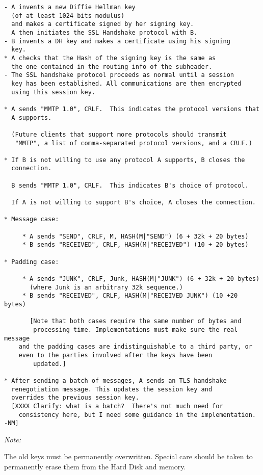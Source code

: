 \begin{verbatim}
- A invents a new Diffie Hellman key 
  (of at least 1024 bits modulus)
  and makes a certificate signed by her signing key.
  A then initiates the SSL Handshake protocol with B.
- B invents a DH key and makes a certificate using his signing
  key.
* A checks that the Hash of the signing key is the same as
  the one contained in the routing info of the subheader.
- The SSL handshake protocol proceeds as normal until a session
  key has been established. All communications are then encrypted
  using this session key.

* A sends "MMTP 1.0", CRLF.  This indicates the protocol versions that
  A supports.

  (Future clients that support more protocols should transmit
   "MMTP", a list of comma-separated protocol versions, and a CRLF.)

* If B is not willing to use any protocol A supports, B closes the 
  connection.

  B sends "MMTP 1.0", CRLF.  This indicates B's choice of protocol.

  If A is not willing to support B's choice, A closes the connection.

* Message case:

     * A sends "SEND", CRLF, M, HASH(M|"SEND") (6 + 32k + 20 bytes)
     * B sends "RECEIVED", CRLF, HASH(M|"RECEIVED") (10 + 20 bytes)

* Padding case:

     * A sends "JUNK", CRLF, Junk, HASH(M|"JUNK") (6 + 32k + 20 bytes)
       (where Junk is an arbitrary 32k sequence.)
     * B sends "RECEIVED", CRLF, HASH(M|"RECEIVED JUNK") (10 +20 bytes)

       [Note that both cases require the same number of bytes and 
        processing time. Implementations must make sure the real message 
	and the padding cases are indistinguishable to a third party, or 
	even to the parties involved after the keys have been
        updated.]

* After sending a batch of messages, A sends an TLS handshake
  renegotiation message. This updates the session key and
  overrides the previous session key.
  [XXXX Clarify: what is a batch?  There's not much need for
    consistency here, but I need some guidance in the implementation. -NM]

\end{verbatim}

\emph{Note:}

The old keys must be permanently overwritten. Special care should be
taken to permanently erase them from the Hard Disk and memory. 


